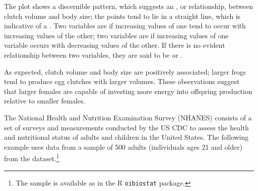 The plot shows a discernible pattern, which suggests an , or relationship,  between clutch volume and body size; the points tend to lie in a straight line, which is indicative of a . Two variables are  if increasing values of one tend to occur with increasing values of the other; two variables are  if increasing values of one variable occurs with decreasing values of the other. If there is no evident relationship between two variables, they are said to be  or .

As expected, clutch volume and body size are positively associated; larger frogs tend to produce egg clutches with larger volumes. These observations suggest that larger females are capable of investing more energy into offspring production relative to smaller females.


The National Health and Nutrition Examination Survey (NHANES) consists of a set of surveys and measurements conducted by the US CDC to assess the health and nutritional status of adults and children in the United States. The following example uses data from a sample of 500 adults (individuals ages 21 and older) from the  dataset.\footnote{The sample is available as  in the \textsf{R} \texttt{oibiostat} package.}

